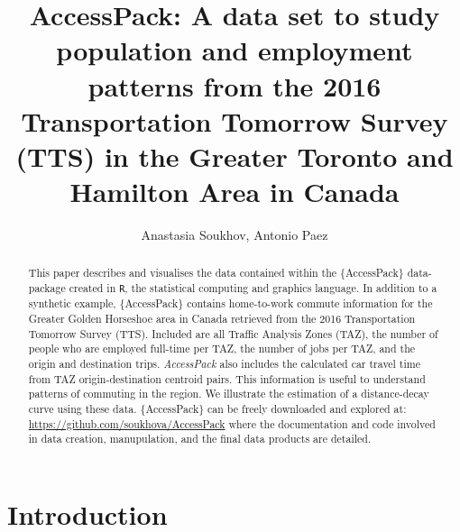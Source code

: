 \documentclass[Royal,times,sageh]{sagej}
\begin{document}

\title{AccessPack: A data set to study population and employment
patterns from the 2016 Transportation Tomorrow Survey (TTS) in the
Greater Toronto and Hamilton Area in Canada}

\runninghead{}

\author{Anastasia Soukhov\affilnum{}, Antonio Paez\affilnum{}}

\affiliation{\affilnum{}{}}



\begin{abstract}
This paper describes and visualises the data contained within the
\{AccessPack\} data-package created in \texttt{R}, the statistical
computing and graphics language. In addition to a synthetic example,
\{AccessPack\} contains home-to-work commute information for the Greater
Golden Horseshoe area in Canada retrieved from the 2016 Transportation
Tomorrow Survey (TTS). Included are all Traffic Analysis Zones (TAZ),
the number of people who are employed full-time per TAZ, the number of
jobs per TAZ, and the origin and destination trips. \emph{AccessPack}
also includes the calculated car travel time from TAZ origin-destination
centroid pairs. This information is useful to understand patterns of
commuting in the region. We illustrate the estimation of a
distance-decay curve using these data. \{AccessPack\} can be freely
downloaded and explored at: \url{https://github.com/soukhova/AccessPack}
where the documentation and code involved in data creation,
manupulation, and the final data products are detailed.
\end{abstract}


\maketitle

\hypertarget{introduction}{%
\section{Introduction}\label{introduction}}
\end{document}
